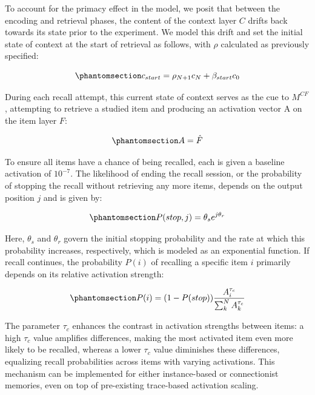 \documentclass[
  letterpaper,
  11pt,
  english,
  singlespacing,
  headsepline]{MastersDoctoralThesis}
\begin{document}
To account for the primacy effect in the model, we posit that between
the encoding and retrieval phases, the content of the context layer
\(C\) drifts back towards its state prior to the experiment. We model
this drift and set the initial state of context at the start of
retrieval as follows, with \(\rho\) calculated as previously specified:

\begin{equation}\phantomsection\label{eq-15}{
c_{start} = \rho_{N+1}c_N + \beta_{start}c_0
}\end{equation}

During each recall attempt, this current state of context serves as the
cue to \(M^{CF}\), attempting to retrieve a studied item and producing
an activation vector A on the item layer \(F\):

\begin{equation}\phantomsection\label{eq-155}{
A = \hat{F}
}\end{equation}

To ensure all items have a chance of being recalled, each is given a
baseline activation of \(10^{-7}\). The likelihood of ending the recall
session, or the probability of stopping the recall without retrieving
any more items, depends on the output position \(j\) and is given by:

\begin{equation}\phantomsection\label{eq-16}{
P(stop, j) = \theta_s e^{j\theta_r}
}\end{equation}

Here, \(\theta_s\) and \(\theta_r\) govern the initial stopping
probability and the rate at which this probability increases,
respectively, which is modeled as an exponential function. If recall
continues, the probability \(P(i)\) of recalling a specific item \(i\)
primarily depends on its relative activation strength:

\begin{equation}\phantomsection\label{eq-17}{
P(i) = (1-P(stop))\frac{A^{\tau_{c}}_i}{\sum_{k}^{N}A^{\tau_{c}}_k}
}\end{equation}

The parameter \(\tau_{c}\) enhances the contrast in activation strengths
between items: a high \(\tau_{c}\) value amplifies differences, making
the most activated item even more likely to be recalled, whereas a lower
\(\tau_{c}\) value diminishes these differences, equalizing recall
probabilities across items with varying activations. This mechanism can
be implemented for either instance-based or connectionist memories, even
on top of pre-existing trace-based activation scaling.
\end{document}
